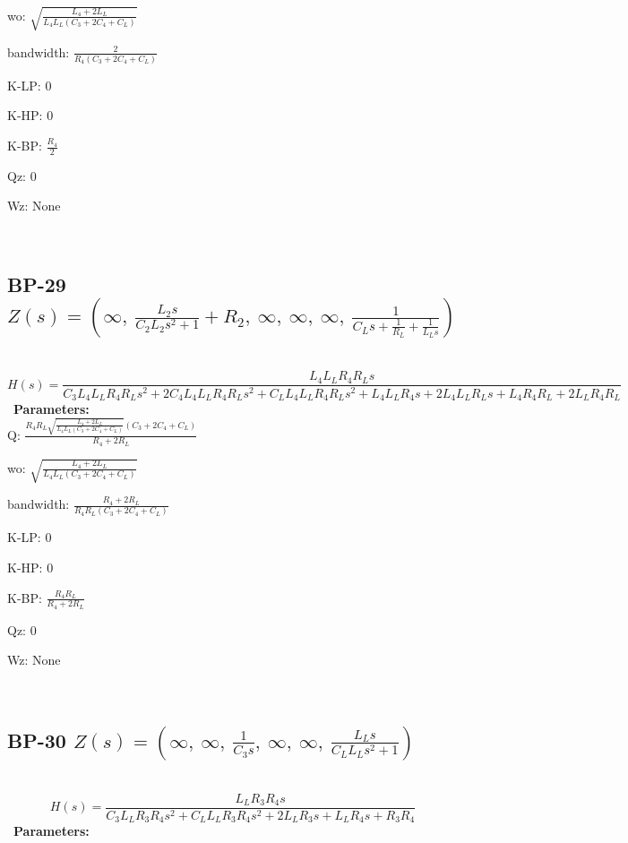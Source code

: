 \documentclass{article}
\begin{document}
wo: $\sqrt{\frac{L_{4} + 2 L_{L}}{L_{4} L_{L} \left(C_{3} + 2 C_{4} + C_{L}\right)}}$\ 

bandwidth: $\frac{2}{R_{4} \left(C_{3} + 2 C_{4} + C_{L}\right)}$\ 

K-LP: $0$\ 

K-HP: $0$\ 

K-BP: $\frac{R_{4}}{2}$\ 

Qz: $0$\ 

Wz: $\text{None}$\ 

\ 

\subsection{BP-29 $Z(s) = \left( \infty, \  \frac{L_{2} s}{C_{2} L_{2} s^{2} + 1} + R_{2}, \  \infty, \  \infty, \  \infty, \  \frac{1}{C_{L} s + \frac{1}{R_{L}} + \frac{1}{L_{L} s}}\right)$ } \ 
\textbf{\[H(s) = \frac{L_{4} L_{L} R_{4} R_{L} s}{C_{3} L_{4} L_{L} R_{4} R_{L} s^{2} + 2 C_{4} L_{4} L_{L} R_{4} R_{L} s^{2} + C_{L} L_{4} L_{L} R_{4} R_{L} s^{2} + L_{4} L_{L} R_{4} s + 2 L_{4} L_{L} R_{L} s + L_{4} R_{4} R_{L} + 2 L_{L} R_{4} R_{L}}\] } \ 
\textbf{Parameters:}\\ 

Q: $\frac{R_{4} R_{L} \sqrt{\frac{L_{4} + 2 L_{L}}{L_{4} L_{L} \left(C_{3} + 2 C_{4} + C_{L}\right)}} \left(C_{3} + 2 C_{4} + C_{L}\right)}{R_{4} + 2 R_{L}}$\ 

wo: $\sqrt{\frac{L_{4} + 2 L_{L}}{L_{4} L_{L} \left(C_{3} + 2 C_{4} + C_{L}\right)}}$\ 

bandwidth: $\frac{R_{4} + 2 R_{L}}{R_{4} R_{L} \left(C_{3} + 2 C_{4} + C_{L}\right)}$\ 

K-LP: $0$\ 

K-HP: $0$\ 

K-BP: $\frac{R_{4} R_{L}}{R_{4} + 2 R_{L}}$\ 

Qz: $0$\ 

Wz: $\text{None}$\ 

\ 

\subsection{BP-30 $Z(s) = \left( \infty, \  \infty, \  \frac{1}{C_{3} s}, \  \infty, \  \infty, \  \frac{L_{L} s}{C_{L} L_{L} s^{2} + 1}\right)$ } \ 
\textbf{\[H(s) = \frac{L_{L} R_{3} R_{4} s}{C_{3} L_{L} R_{3} R_{4} s^{2} + C_{L} L_{L} R_{3} R_{4} s^{2} + 2 L_{L} R_{3} s + L_{L} R_{4} s + R_{3} R_{4}}\] } \ 
\textbf{Parameters:}\\ 
\end{document}
